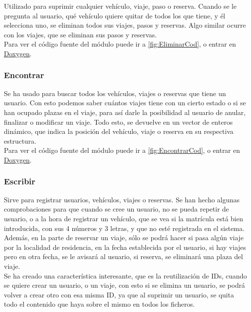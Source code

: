 Utilizado para suprimir cualquier vehículo, viaje, paso o reserva. Cuando se le pregunta al usuario, qué vehículo quiere quitar de todos los que tiene,
y él selecciona uno, se eliminan todos sus viajes, pasos y reservas. Algo similar ocurre con los viajes, que se eliminan sus pasos y reservas.\\

Para ver el código fuente del módulo puede ir a \ref{fig:EliminarCod}, o entrar en \href{DOC_DOXYGEN/eliminar_8h_source.html}{Doxygen}.
\label{fig:Eliminar}

\subsubsection{Encontrar}

Se ha usado para buscar todos los vehículos, viajes o reservas que tiene un usuario. Con esto podemos saber cuántos viajes
tiene con un cierto estado o si se han ocupado plazas en el viaje, para así darle la posibilidad al usuario de anular, finalizar o modificar un viaje.
Todo esto, se devuelve en un vector de enteros dinámico, que indica la posición del vehículo, viaje o reserva en su respectiva estructura.\\

Para ver el código fuente del módulo puede ir a \ref{fig:EncontrarCod}, o entrar en \href{DOC_DOXYGEN/encontrar_8h_source.html}{Doxygen}.
\label{fig:Encontrar}

\subsubsection{Escribir}

Sirve para registrar usuarios, vehículos, viajes o reservas. Se han hecho algunas comprobaciones para que cuando se cree un usuario, no se pueda repetir de usuario,
o a la hora de registrar un vehículo, que se vea si la matrícula está bien introducida, con sus 4 números y 3 letras, y que no esté registrada en el sistema.
Además, en la parte de reservar un viaje, sólo se podrá hacer si pasa algún viaje por la localidad de residencia, en la fecha establecida por el usuario,
si hay viajes pero en otra fecha, se le avisará al usuario, si reserva, se eliminará una plaza del viaje.\\
Se ha creado una característica interesante, que es la reutilización de IDs, cuando se quiere crear un usuario, o un viaje, con esto si se elimina un usuario,
se podrá volver a crear otro con esa misma ID, ya que al suprimir un usuario, se quita todo el contenido que haya sobre el mismo en todos los ficheros.\\

